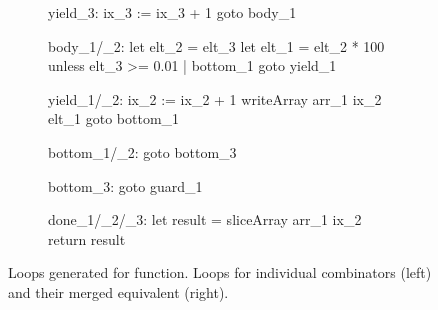 \documentclass[preamble.tex]{subfiles}
\begin{document}
\begin{figure}
\begin{subfigure}{.55\textwidth}
\begin{loopcode}[%
    literate=
        {_1}{{\sub{map}}}3  %
        {_2}{{\sub{filt}}}2 %
        {_3}{{\sub{mfst}}}3 %
]
yield_3:
  ix_3 := ix_3 + 1
  goto body_1



body_1/_2:
  let elt_2 = elt_3
  let elt_1 = elt_2 * 100
  unless elt_3 >= 0.01 | bottom_1
  goto yield_1

yield_1/_2:
  ix_2 := ix_2 + 1
  writeArray arr_1 ix_2 elt_1
  goto bottom_1

bottom_1/_2:
  goto bottom_3



bottom_3:
  goto guard_1

done_1/_2/_3:
  let result = sliceArray arr_1 ix_2
  return result
\end{loopcode}
\end{subfigure}
\caption{Loops generated for  function. Loops for individual combinators (left) and their merged equivalent (right).}
\label{fig:toPercentages-loops}
\end{figure}
\end{document}
